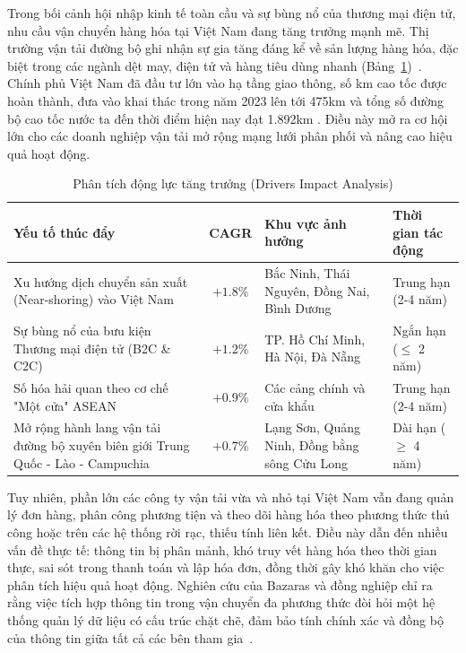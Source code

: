 \documentclass[11pt]{report}
\begin{document}
Trong bối cảnh hội nhập kinh tế toàn cầu và sự bùng nổ của thương mại điện tử, nhu cầu vận chuyển hàng hóa tại Việt Nam đang tăng trưởng mạnh mẽ. Thị trường vận tải đường bộ ghi nhận sự gia tăng đáng kể về sản lượng hàng hóa, đặc biệt trong các ngành dệt may, điện tử và hàng tiêu dùng nhanh (Bảng~\ref{tab:phantichdongluctangtruong})~\cite{mordor2024vn}. Chính phủ Việt Nam đã đầu tư lớn vào hạ tầng giao thông, số km cao tốc được hoàn thành, đưa vào khai thác trong năm 2023 lên tới 475km và tổng số đường bộ cao tốc nước ta đến thời điểm hiện nay đạt 1.892km \cite{vneconomy2025caotoc}. Điều này mở ra cơ hội lớn cho các doanh nghiệp vận tải mở rộng mạng lưới phân phối và nâng cao hiệu quả hoạt động.

\begin{table}[H]
    \centering
    \renewcommand{\tabularxcolumn}[1]{m{#1}}
    \begin{tabularx}{\textwidth}{|>{\raggedright\arraybackslash}X|c|>{\raggedright\arraybackslash}X|>{\raggedright\arraybackslash}l|} \hline
        \rowcolor{teal!30}
        \textbf{Yếu tố thúc đẩy} & \textbf{CAGR} & \textbf{Khu vực ảnh hưởng} & \textbf{Thời gian tác động} \\ \hline
        Xu hướng dịch chuyển sản xuất (Near-shoring) vào Việt Nam                       & \(+1.8\%\) & Bắc Ninh, Thái Nguyên, Đồng Nai, Bình Dương   & Trung hạn (2-4 năm) \\ \hline
        Sự bùng nổ của bưu kiện Thương mại điện tử (B2C \& C2C)                         & \(+1.2\%\) & TP. Hồ Chí Minh, Hà Nội, Đà Nẵng              & Ngắn hạn ($\le$ 2 năm) \\ \hline 
        Số hóa hải quan theo cơ chế "Một cửa" ASEAN                                     & \(+0.9\%\) & Các cảng chính và cửa khẩu                    & Trung hạn (2-4 năm) \\ \hline
        Mở rộng hành lang vận tải đường bộ xuyên biên giới Trung Quốc - Lào - Campuchia & \(+0.7\%\) & Lạng Sơn, Quảng Ninh, Đồng bằng sông Cửu Long & Dài hạn ($\ge$ 4 năm) \\ \hline
    \end{tabularx}
    \caption{Phân tích động lực tăng trưởng (Drivers Impact Analysis)}
    \label{tab:phantichdongluctangtruong}
\end{table}

Tuy nhiên, phần lớn các công ty vận tải vừa và nhỏ tại Việt Nam vẫn đang quản lý đơn hàng, phân công phương tiện và theo dõi hàng hóa theo phương thức thủ công hoặc trên các hệ thống rời rạc, thiếu tính liên kết. Điều này dẫn đến nhiều vấn đề thực tế: thông tin bị phân mảnh, khó truy vết hàng hóa theo thời gian thực, sai sót trong thanh toán và lập hóa đơn, đồng thời gây khó khăn cho việc phân tích hiệu quả hoạt động. Nghiên cứu của Bazaras và đồng nghiệp chỉ ra rằng việc tích hợp thông tin trong vận chuyển đa phương thức đòi hỏi một hệ thống quản lý dữ liệu có cấu trúc chặt chẽ, đảm bảo tính chính xác và đồng bộ của thông tin giữa tất cả các bên tham gia~\cite{bazaras2024multimodal}.
\end{document}
